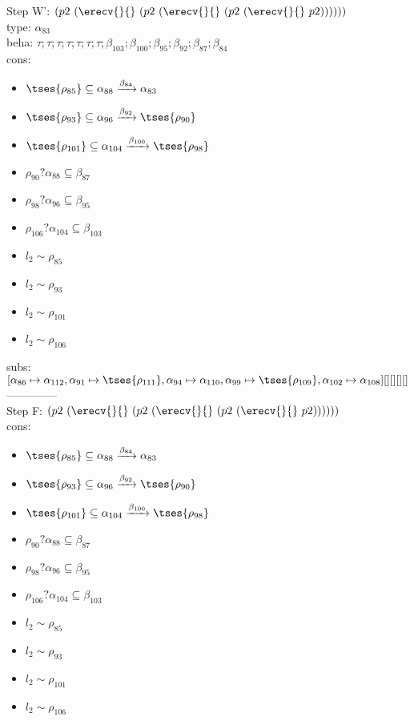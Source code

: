 \documentclass[12pt]{article}
\begin{document}
Step W': $ (p2~(\erecv{}{}~(p2~(\erecv{}{}~(p2~(\erecv{}{}~p2)))))) $\\
  type: $ \alpha_{83} $ 
\\  beha: $ \tau; \tau; \tau; \tau; \tau; \tau; \tau; \beta_{103}; \beta_{100}; \beta_{95}; \beta_{92}; \beta_{87}; \beta_{84} $ 
\\  cons: \begin{itemize}
\item $  \tses{ \rho_{85}} \subseteq \alpha_{88} \xrightarrow{\beta_{84}} \alpha_{83} $
\item $  \tses{ \rho_{93}} \subseteq \alpha_{96} \xrightarrow{\beta_{92}}  \tses{ \rho_{90}} $
\item $  \tses{ \rho_{101}} \subseteq \alpha_{104} \xrightarrow{\beta_{100}}  \tses{ \rho_{98}} $
\item $ \rho_{90}?\alpha_{88} \subseteq \beta_{87} $
\item $ \rho_{98}?\alpha_{96} \subseteq \beta_{95} $
\item $ \rho_{106}?\alpha_{104} \subseteq \beta_{103} $
\item $ l_{2} \sim\rho_{85} $
\item $ l_{2} \sim\rho_{93} $
\item $ l_{2} \sim\rho_{101} $
\item $ l_{2} \sim\rho_{106} $
\end{itemize} 
  subs:  $ [ \alpha_{86}\mapsto\alpha_{112}, \alpha_{91}\mapsto \tses{ \rho_{111}}, \alpha_{94}\mapsto\alpha_{110}, \alpha_{99}\mapsto \tses{ \rho_{109}}, \alpha_{102}\mapsto\alpha_{108}] [] [] [] [] $  
 \\--------------\\ 
Step F: $ (p2~(\erecv{}{}~(p2~(\erecv{}{}~(p2~(\erecv{}{}~p2)))))) $
 \\ cons: \begin{itemize}
\item $  \tses{ \rho_{85}} \subseteq \alpha_{88} \xrightarrow{\beta_{84}} \alpha_{83} $
\item $  \tses{ \rho_{93}} \subseteq \alpha_{96} \xrightarrow{\beta_{92}}  \tses{ \rho_{90}} $
\item $  \tses{ \rho_{101}} \subseteq \alpha_{104} \xrightarrow{\beta_{100}}  \tses{ \rho_{98}} $
\item $ \rho_{90}?\alpha_{88} \subseteq \beta_{87} $
\item $ \rho_{98}?\alpha_{96} \subseteq \beta_{95} $
\item $ \rho_{106}?\alpha_{104} \subseteq \beta_{103} $
\item $ l_{2} \sim\rho_{85} $
\item $ l_{2} \sim\rho_{93} $
\item $ l_{2} \sim\rho_{101} $
\item $ l_{2} \sim\rho_{106} $
\end{itemize}
\end{document}

